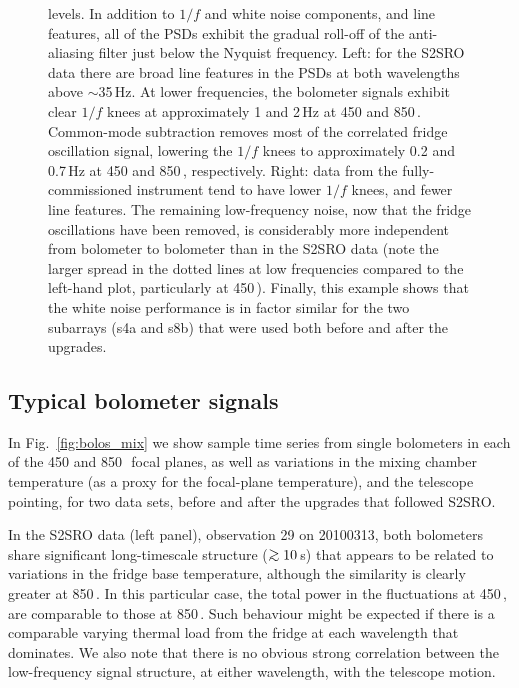 \documentclass[useAMS,usenatbib,nofootinbib]{mn2e}
\def\gsim{\mathrel{\lower2.5pt\vbox{\lineskip=0pt\baselineskip=0pt
          \hbox{$>$}\hbox{$\sim$}}}}
\begin{document}
\begin{figure}
{  levels. In addition to $1/f$ and white noise components, and line
  features, all of the PSDs exhibit the gradual roll-off of the
  anti-aliasing filter just below the Nyquist frequency.  Left: for
  the S2SRO data there are broad line features in the PSDs at both
  wavelengths above $\sim$35\,Hz.  At lower frequencies, the bolometer
  signals exhibit clear $1/f$ knees at approximately 1 and 2\,Hz at
  450 and 850\,\micron. Common-mode subtraction removes most of the
  correlated fridge oscillation signal, lowering the $1/f$ knees to
  approximately 0.2 and 0.7\,Hz at 450 and 850\,\micron,
  respectively. Right: data from the fully-commissioned instrument
  tend to have lower $1/f$ knees, and fewer line features. The
  remaining low-frequency noise, now that the fridge oscillations have
  been removed, is considerably more independent from bolometer to
  bolometer than in the S2SRO data (note the larger spread in the
  dotted lines at low frequencies compared to the left-hand plot,
  particularly at 450\,\micron). Finally, this example shows that the
  white noise performance is in factor similar for the two subarrays
  (s4a and s8b) that were used both before and after the upgrades.}
\label{fig:pspec}
\end{figure}


\subsection{Typical bolometer signals}
\label{sec:bolosignal}

In Fig.~\ref{fig:bolos_mix} we show sample time series from single
bolometers in each of the 450 and 850\,\micron\ focal planes, as well
as variations in the mixing chamber temperature (as a proxy for the
focal-plane temperature), and the telescope pointing, for two data
sets, before and after the upgrades that followed S2SRO.

In the S2SRO data (left panel), observation 29 on 20100313, both
bolometers share significant long-timescale structure ($\gsim10$\,s)
that appears to be related to variations in the fridge base
temperature, although the similarity is clearly greater at
850\,\micron. In this particular case, the total power in the
fluctuations at 450\,\micron, are comparable to those at
850\,\micron. Such behaviour might be expected if there is a
comparable varying thermal load from the fridge at each wavelength
that dominates. We also note that there is no obvious strong
correlation between the low-frequency signal structure, at either
wavelength, with the telescope motion.
\end{document}
